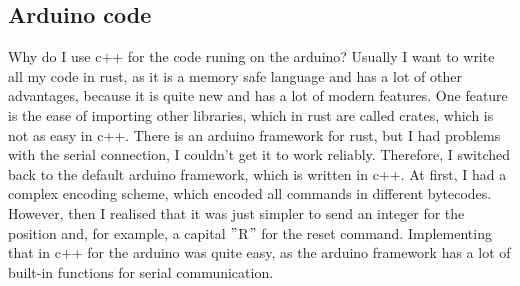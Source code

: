 \subsection{Arduino code}\label{subsec:arduino-code}
Why do I use c++ for the code runing on the arduino?
Usually I want to write all my code in rust, as it is a memory safe language and has a lot of other advantages, because it is quite new and has a lot of modern features.
One feature is the ease of importing other libraries, which in rust are called crates, which is not as easy in c++.
There is an arduino framework for rust, but I had problems with the serial connection, I couldn't get it to work reliably.
Therefore, I switched back to the default arduino framework, which is written in c++.
At first, I had a complex encoding scheme, which encoded all commands in different bytecodes.
However, then I realised that it was just simpler to send an integer for the position and, for example, a capital \("\)R\("\) for the reset command.
Implementing that in c++ for the arduino was quite easy, as the arduino framework has a lot of built-in functions for serial communication.